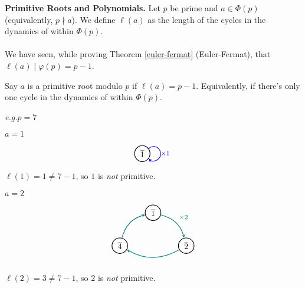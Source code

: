\vspace*{2em}

{\bf Primitive Roots and Polynomials.} Let $p$ be prime and $a \in \Phi(p)$ (equivalently, $p\nmid a$). We define $\ell(a)$ as the length of the cycles in the dynamics of  within $\Phi(p)$.\\
\\
We have seen, while proving Theorem \ref{euler-fermat} (Euler-Fermat), that $\ell(a) \mid \varphi(p) = p-1$.

\vspace*{1em}

\begin{definition}
Say $a$ is a primitive root modulo $p$ if $\ell(a) = p-1$. Equivalently, if there's only one cycle in the dynamics of  within $\Phi(p)$.
\end{definition}


\emph{e.g.}\quad $p = 7$

\vspace*{1em}

\begin{minipage}{0.15\textwidth}
\qquad $a = 1$ 
\end{minipage}
\quad
\begin{minipage}{0.25\textwidth}
\[\begin{tikzpicture}[->,>=stealth,auto,node distance=3cm,
  thick,main node/.style={circle,draw}]

  \node[main node] (1) {$\overline{1}$};
\draw[blue]	(1.37) arc (135:-135:3mm) node[pos=0.3,below right] {\footnotesize$\times 1$} (1);
\end{tikzpicture}\]
\end{minipage}
\quad\!
\begin{minipage}{0.53\textwidth}
$\ell(1) = 1 \neq 7 - 1$, so $1$ is \emph{not} primitive. 
\end{minipage}

\vspace*{2em}

\begin{minipage}{0.15\textwidth}
\qquad $a = 2$ 
\end{minipage}
\begin{minipage}{0.25\textwidth}
\[\begin{tikzpicture}[->,>=stealth,auto,node distance=2cm,
  thick,main node/.style={circle,draw}]

  \node[main node] (1) {$\overline{1}$};
  \node[main node] (2) [below right of= 1] {$\overline{2}$};
  \node[main node] (3) [below left of=1] {$\overline{4}$};
\path[every node/.style={font=\sffamily\small}]
	(1) edge[teal,bend left] node[] {\footnotesize$\times 2$} (2)
	(2) edge[teal,bend left] node[] {} (3)
	(3) edge[teal,bend left] node[] {} (1);
\end{tikzpicture}\]
\end{minipage}
\qquad
\begin{minipage}{0.53\textwidth}
$\ell(2) = 3 \neq 7 - 1$, so $2$ is \emph{not} primitive. 
\end{minipage}

